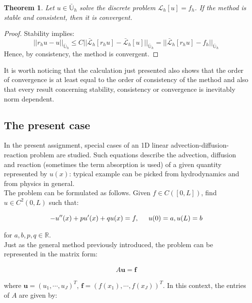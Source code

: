 \documentclass[11pt]{article}
\theoremstyle{theorem}
\newtheorem{theorem}{Theorem}
\theoremstyle{definition}
\begin{document}
\begin{theorem}
	\label{thm:stab-conv}
	Let $u\in\bar{\mathbb{U}}_h$ solve the discrete problem $\mathcal{L}_h[u]=f_h$. If the method is stable and consistent, then it is convergent. 
\end{theorem}
\begin{proof}
	Stability implies:
	$$||r_hu-u||_{{\bar{\mathbb{U}}}_h}\le C ||\bar{\mathcal{L}}_h[r_hu]-\bar{\mathcal{L}}_h[u]||_{{\bar{\mathbb{U}}}_h}=||\bar{\mathcal{L}}_h[r_hu]-f_h||_{{\bar{\mathbb{U}}}_h}$$
	Hence, by consistency, the method is convergent.
\end{proof}

It is worth noticing that the calculation just presented also shows that the order of convergence is at least equal to the order of consistency of the method and also that every result concerning stability, consistency or convergence is inevitably norm dependent.\\

\subsection{The present case}
\label{subsec:the-present-case}
In the present assignment, special cases of an 1D linear advection-diffusion-reaction problem are studied. Such equations describe the advection, diffusion and reaction (sometimes the term absorption is used) of a given quantity represented by $u(x)$: typical example can be picked from hydrodynamics and from physics in general.\\
The problem can be formulated as follows. Given $f\in C([0, L])$, find $u\in C^2(0, L)$ such that:

\begin{equation}
	\label{eqn:ass-prob}
	-u''(x)+ pu'(x)+qu(x)= f,\hspace{5mm}u(0)=a, u(L)=b
\end{equation}

for $a, b, p, q\in\mathbb{R}$. \\

Just as the general method previously introduced, the problem can be represented in the matrix form:

\begin{align}
	\label{eqn:matrix-form}
	A\mathbf{u}=\mathbf{f}
\end{align}

where $\mathbf{u}=(u_1, \cdots, u_J)^{T}$, $\mathbf{f}=(f(x_1),\cdots , f(x_J))^{T}$. In this context, the entries of $A$ are given by:
\end{document}
